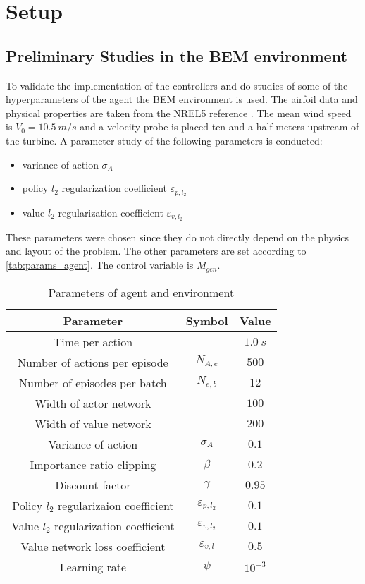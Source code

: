 \section{Setup}
\subsection{Preliminary Studies in the BEM environment}
To validate the implementation of the controllers and do studies of some of the hyperparameters of the agent the BEM environment is used. The airfoil data and physical properties are taken from the NREL5 reference \cite{jonkman_definition_2009}. The mean wind speed is $V_0=\SI{10.5}{m/s}$ and a velocity probe is placed ten and a half meters upstream of the turbine. A parameter study of the following parameters is conducted:
\begin{itemize}
	\item variance of action $\sigma_A$
	\item policy $l_2$ regularization coefficient $\varepsilon_{p,l_2}$
	\item value $l_2$ regularization coefficient $\varepsilon_{v,l_2}$
\end{itemize}
These parameters were chosen since they do not directly depend on the physics and layout of the problem. The other parameters are set according to \autoref{tab:params_agent}. The control variable is $M_{gen}$. 
\begin{table}[h]
	\centering
	\caption{Parameters of agent and environment}
	\begin{tabular}{|c|c|c|}
		\hline
		Parameter & Symbol & Value \\
		\hline \hline
		Time per action & & $\SI{1.0}{s}$ \\ \hline
		Number of actions per episode & $N_{A,e}$ & $500$ \\ \hline
		Number of episodes per batch & $N_{e,b}$ & $12$ \\ \hline
		Width of actor network & & $100$ \\ \hline
		Width of value network & & $200$ \\ \hline
		Variance of action & $\sigma_A$ & $0.1$ \\ \hline
		Importance ratio clipping & $\beta$ & $0.2$ \\ \hline
		Discount factor & $\gamma$ & $0.95$ \\ \hline
		Policy $l_2$ regularizaion coefficient & $\varepsilon_{p,l_2} $ & $0.1$ \\ \hline
		Value $l_2$ regularization coefficient & $\varepsilon_{v,l_2}$ & $0.1$ \\ \hline
		Value network loss coefficient & $\varepsilon_{v,l}$ & $0.5$ \\ \hline
		Learning rate & $\psi$ & $10^{-3}$ \\
		\hline 
	\end{tabular}
	\label{tab:params_agent}
\end{table}

